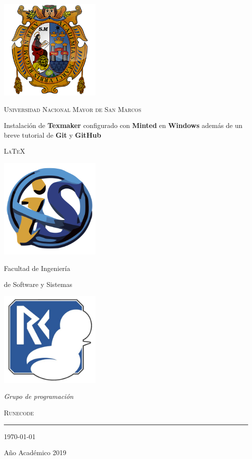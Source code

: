 \documentclass[a4paper,12pt]{book}
\begin{document}
\begin{titlepage}
  \vspace*{-3cm}
  \centering
  \includegraphics[width=5cm]{./escudo_UNMSM.png}

  {\scshape\LARGE Universidad Nacional Mayor de San Marcos\par}

  \vspace{1cm}

  {\large Instalación de \textbf{Texmaker} configurado con \textbf{Minted}
  en \textbf{Windows} además de un breve tutorial de \textbf{Git} y \textbf{GitHub} \par}

  \vspace{.1\textheight}
  { \LARGE \scshape \LaTeX}

  \vspace{.1\textheight}

  \parbox{.4\linewidth}{
    \includegraphics[width=5cm]{./escudo_FISI.png}\par
    {Facultad de Ingeniería\par
    de Software y Sistemas}
    }\hfill
  \parbox{.5\linewidth}{
    \raggedleft
    \includegraphics[width=5cm]{./captura.jpg}\par
    \emph{Grupo de programación}\par
    \textsc{Runecode}%
  }

    \vspace{.1\linewidth}
    \vfill
    \rule{.4\textwidth}{.4pt}

  {\large \today\par
  Año Académico 2019\par}

\end{titlepage}
\end{document}
